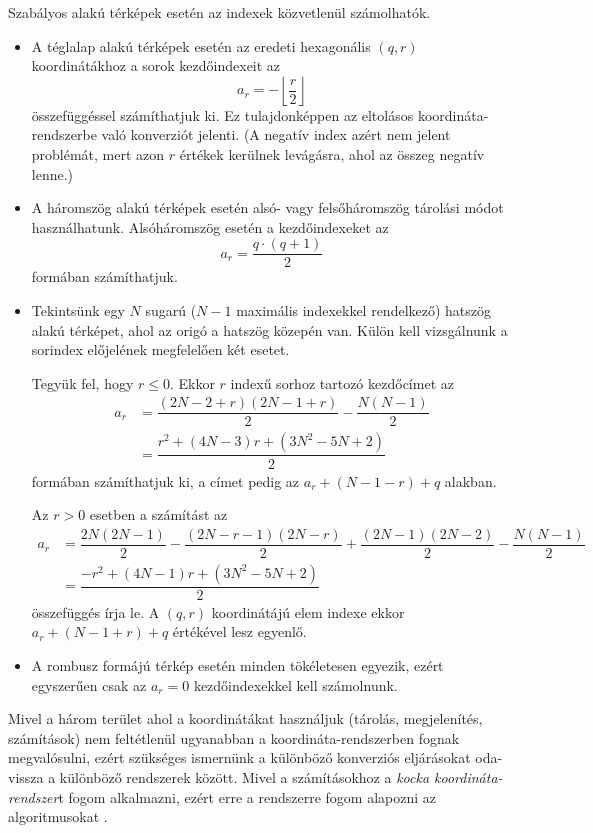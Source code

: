 Szabályos alakú térképek esetén az indexek közvetlenül számolhatók.
\begin{itemize}
\item A téglalap alakú térképek esetén az eredeti hexagonális $(q, r)$ koordinátákhoz a sorok kezdőindexeit az
$$
a_r = - \left\lfloor \dfrac{r}{2} \right\rfloor
$$
összefüggéssel számíthatjuk ki. Ez tulajdonképpen az eltolásos koordináta-rend\-szer\-be való konverziót jelenti. (A negatív index azért nem jelent problémát, mert azon $r$ értékek kerülnek levágásra, ahol az összeg negatív lenne.)
\item A háromszög alakú térképek esetén alsó- vagy felsőháromszög tárolási módot használhatunk. Alsóháromszög esetén a kezdőindexeket az
$$
a_r = \dfrac{q \cdot (q + 1)}{2}
$$
formában számíthatjuk.
\item Tekintsünk egy $N$ sugarú ($N - 1$ maximális indexekkel rendelkező) hatszög alakú térképet, ahol az origó a hatszög közepén van. Külön kell vizsgálnunk a sorindex előjelének megfelelően két esetet.

Tegyük fel, hogy $r \leq 0$. Ekkor $r$ indexű sorhoz tartozó kezdőcímet az
\begin{align*}
a_r &=
\dfrac{
(2N - 2 + r)(2N - 1 + r)
}{2}
-
\dfrac{
N(N - 1)
}{2} \\
&=
\dfrac{r^2 + (4N - 3)r + (3N^2 - 5N + 2)}{2}
\end{align*}
formában számíthatjuk ki, a címet pedig az $a_r + (N - 1 -r) + q$ alakban.

Az $r > 0$ esetben a számítást az
\begin{align*}
a_r &=
\dfrac{2N(2N - 1)}{2} -
\dfrac{(2N - r - 1)(2N - r)}{2} +
\dfrac{(2N - 1)(2N - 2)}{2} -
\dfrac{N(N - 1)}{2} \\
&=
\dfrac{-r^2 + (4N - 1)r + (3N^2 - 5N + 2)}
{2}
\end{align*}
összefüggés írja le. A $(q, r)$ koordinátájú elem indexe ekkor $a_r + (N - 1 + r) + q$ értékével lesz egyenlő.
\item A rombusz formájú térkép esetén minden tökéletesen egyezik, ezért egyszerűen csak az $a_r = 0$ kezdőindexekkel kell számolnunk.
\end{itemize}


Mivel a három terület ahol a koordinátákat használjuk (tárolás, megjelenítés, számítások) nem feltétlenül ugyanabban a koordináta-rendszerben fognak megvalósulni, ezért szükséges ismernünk a különböző konverziós eljárásokat oda-vissza a különböző rendszerek között. Mivel a számításokhoz a \textit{kocka koordináta-rendszer}t fogom alkalmazni, ezért erre a rendszerre fogom alapozni az algoritmusokat \cite{Conversion}.

